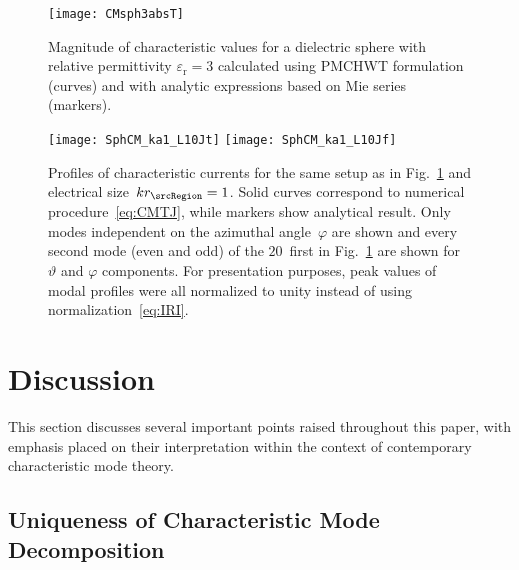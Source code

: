 \documentclass[journal]{IEEEtran}
\providecommand{\aCircum}{r_\srcRegion} %
\begin{document}
\begin{figure}[t]
    \centering
    \texttt{[image: CMsph3absT]}
    \caption{Magnitude of characteristic values for a dielectric sphere with relative permittivity $\varepsilon_{\mathrm{r}}=3$ calculated using PMCHWT formulation (curves) and with analytic expressions based on Mie series (markers).}
    \label{fig:dielsphere3}
\end{figure}

    

\begin{figure}[]
    \centering
    \texttt{[image: SphCM\_ka1\_L10Jt]}
    \texttt{[image: SphCM\_ka1\_L10Jf]}
    \caption{Profiles of characteristic currents for the same setup as in Fig.~\ref{fig:dielsphere3} and electrical size~$k\aCircum=1$. Solid curves correspond to numerical procedure~\eqref{eq:CMTJ}, while markers show analytical result. Only  modes independent on the azimuthal angle~$\varphi$ are shown and every second mode (even and odd) of the $20$~first in Fig.~\ref{fig:dielsphere3} are shown for $\vartheta$ and $\varphi$ components. For presentation purposes, peak values of modal profiles were all normalized to unity instead of using normalization~\eqref{eq:IRI}.}
    \label{fig:dielsphere}
\end{figure}

\section{Discussion}
\label{sec:disc}

This section discusses several important points raised throughout this paper, with emphasis placed on their interpretation within the context of contemporary characteristic mode theory.

\subsection{Uniqueness of Characteristic Mode Decomposition}
\label{sec:disc:uniq}
\end{document}
